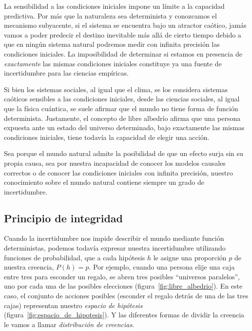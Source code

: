 \documentclass[a4paper,11pt]{book}
\theoremstyle{definition}
\begin{document}
%

La sensibilidad a las condiciones iniciales impone un límite a la capacidad predictiva.
%
Por más que la naturaleza sea determinista y conozcamos el mecanismo subyacente, si el sistema se encuentra bajo un atractor caótico, jamás vamos a poder predecir el destino inevitable más allá de cierto tiempo debido a que en ningún sistema natural podremos medir con infinita precisión las condiciones iniciales.
%
La imposibilidad de determinar si estamos en presencia de \emph{exactamente} las mismas condiciones iniciales constituye ya una fuente de incertidumbre para las ciencias empíricas.


Si bien los sistemas sociales, al igual que el clima, se los considera sistemas caóticos sensibles a las condiciones iniciales, desde las ciencias sociales, al igual que la física cuántica, se suele afirmar que el mundo no tiene forma de función determinista.
%
Justamente, el concepto de libre albedrío afirma que una persona expuesta ante un estado del universo determinado, bajo exactamente las mismas condiciones iniciales, tiene todavía la capacidad de elegir una acción.


Sea porque el mundo natural admite la posibilidad de que un efecto surja sin su propia causa, sea por nuestra incapacidad de conocer los modelos causales correctos o de conocer las condiciones iniciales con infinita precisión, nuestro conocimiento sobre el mundo natural contiene siempre un grado de incertidumbre.


\subsection{Principio de integridad}\label{sec:principio_integridad}


Cuando la incertidumbre nos impide describir el mundo mediante función deterministas, podemos todavía expresar nuestra incertidumbre utilizando funciones de probabilidad, que a cada hipótesis $h$ le asigne una proporción $p$ de nuestra creencia, $P(h) = p$.
%
Por ejemplo, cuando una persona elije una caja entre tres para esconder un regalo, se abren tres posibles ``universos paralelos'', uno por cada una de las posibles elecciones (figura~\ref{fig:libre_albedrio}).
%
En este caso, el conjunto de acciones posibles (esconder el regalo detrás de una de las tres cajas) representan nuestro \emph{espacio de hipótesis} (figura~\ref{fig:espacio_de_hipotesis}).
%
Y las diferentes formas de dividir la creencia le vamos a llamar \emph{distribución de creencias}.
\end{document}
